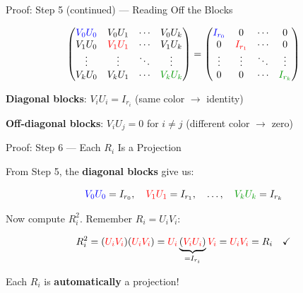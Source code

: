 \documentclass[10pt]{beamer}
\theoremstyle{definition}
\newcommand{\x}[1]{\alert{\textbf{#1}}}
\newcommand{\gn}[1]{{\color{green!60!black}#1}}       %
\newcommand{\rd}[1]{{\color{red}#1}}                  %
\newcommand{\bl}[1]{{\color{blue}#1}}                 %
\begin{document}
\begin{frame}{Proof: Step 5 (continued) --- Reading Off the Blocks}

$$\begin{pmatrix}
\bl{V_0 U_0} & V_0 U_1 & \cdots & V_0 U_k \\
V_1 U_0 & \rd{V_1 U_1} & \cdots & V_1 U_k \\
\vdots & \vdots & \ddots & \vdots \\
V_k U_0 & V_k U_1 & \cdots & \gn{V_k U_k}
\end{pmatrix} = \begin{pmatrix}
\bl{I_{r_0}} & 0 & \cdots & 0 \\
0 & \rd{I_{r_1}} & \cdots & 0 \\
\vdots & \vdots & \ddots & \vdots \\
0 & 0 & \cdots & \gn{I_{r_k}}
\end{pmatrix}$$

\vspace{0.5em}

\x{Diagonal blocks}: $V_i U_i = I_{r_i}$ \quad (same color $\to$ identity)

\vspace{0.3em}

\x{Off-diagonal blocks}: $V_i U_j = 0$ for $i \neq j$ \quad (different color $\to$ zero)

\end{frame}


\begin{frame}{Proof: Step 6 --- Each $R_i$ Is a Projection}

From Step 5, the \x{diagonal blocks} give us:

$$\bl{V_0}\bl{U_0} = I_{r_0}, \quad \rd{V_1}\rd{U_1} = I_{r_1}, \quad \ldots, \quad \gn{V_k}\gn{U_k} = I_{r_k}$$

\vspace{0.3em}

Now compute $R_i^2$. Remember $R_i = U_i V_i$:

$$R_i^2 = (\rd{U_i} \rd{V_i})(\rd{U_i} \rd{V_i}) = \rd{U_i} \underbrace{(\rd{V_i} \rd{U_i})}_{= I_{r_i}} \rd{V_i} = \rd{U_i} \rd{V_i} = R_i \quad \checkmark$$

\vspace{0.5em}

Each $R_i$ is \x{automatically} a projection!

\end{frame}
\end{document}
